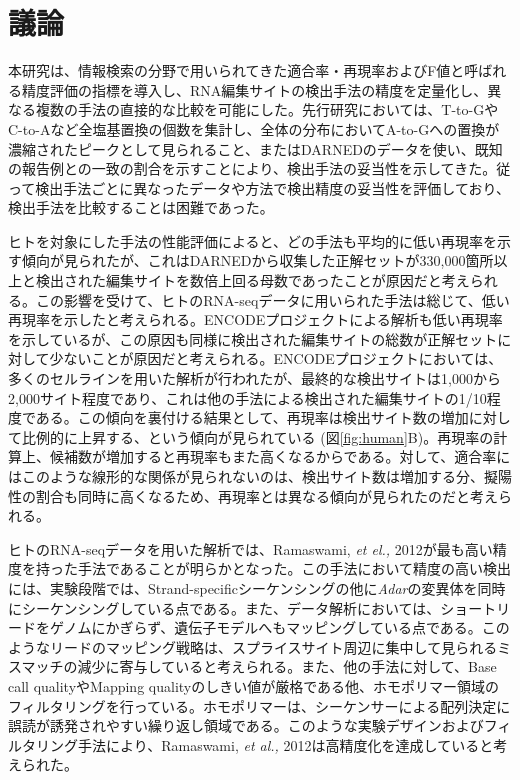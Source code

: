 \section{議論}
本研究は、情報検索の分野で用いられてきた適合率・再現率およびF値と呼ばれる精度評価の指標を導入し、RNA編集サイトの検出手法の精度を定量化し、異なる複数の手法の直接的な比較を可能にした。先行研究においては、T-to-GやC-to-Aなど全塩基置換の個数を集計し、全体の分布においてA-to-Gへの置換が濃縮されたピークとして見られること、またはDARNEDのデータを使い、既知の報告例との一致の割合を示すことにより、検出手法の妥当性を示してきた。従って検出手法ごとに異なったデータや方法で検出精度の妥当性を評価しており、検出手法を比較することは困難であった。
\par
ヒトを対象にした手法の性能評価によると、どの手法も平均的に低い再現率を示す傾向が見られたが、これはDARNEDから収集した正解セットが330,000箇所以上と検出された編集サイトを数倍上回る母数であったことが原因だと考えられる。この影響を受けて、ヒトのRNA-seqデータに用いられた手法は総じて、低い再現率を示したと考えられる。ENCODEプロジェクトによる解析も低い再現率を示しているが、この原因も同様に検出された編集サイトの総数が正解セットに対して少ないことが原因だと考えられる。ENCODEプロジェクトにおいては、多くのセルラインを用いた解析が行われたが、最終的な検出サイトは1,000から2,000サイト程度であり、これは他の手法による検出された編集サイトの1/10程度である。この傾向を裏付ける結果として、再現率は検出サイト数の増加に対して比例的に上昇する、という傾向が見られている (図\ref{fig:human}B)。再現率の計算上、候補数が増加すると再現率もまた高くなるからである。対して、適合率にはこのような線形的な関係が見られないのは、検出サイト数は増加する分、擬陽性の割合も同時に高くなるため、再現率とは異なる傾向が見られたのだと考えられる。
\par
ヒトのRNA-seqデータを用いた解析では、Ramaswami, \textit{et el., }2012が最も高い精度を持った手法であることが明らかとなった。この手法において精度の高い検出には、実験段階では、Strand-specificシーケンシングの他に\textit{Adar}の変異体を同時にシーケンシングしている点である。また、データ解析においては、ショートリードをゲノムにかぎらず、遺伝子モデルへもマッピングしている点である。このようなリードのマッピング戦略は、スプライスサイト周辺に集中して見られるミスマッチの減少に寄与していると考えられる。また、他の手法に対して、Base call qualityやMapping qualityのしきい値が厳格である他、ホモポリマー領域のフィルタリングを行っている。ホモポリマーは、シーケンサーによる配列決定に誤読が誘発されやすい繰り返し領域である。このような実験デザインおよびフィルタリング手法により、Ramaswami, \textit{et al., }2012は高精度化を達成していると考えられた。
